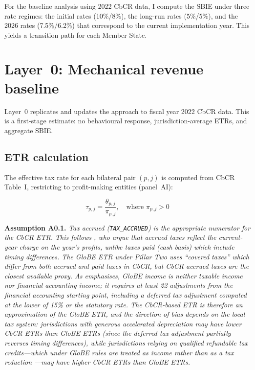 \documentclass[11pt,a4paper]{article}
\newcommand{\code}[1]{\texttt{#1}}
\newcommand{\assumption}[2]{\noindent\textbf{Assumption #1.} \textit{#2}\medskip}
\begin{document}
For the baseline analysis using 2022 CbCR data, I compute the SBIE under three rate regimes: the initial rates (10\%/8\%), the long-run rates (5\%/5\%), and the 2026 rates (7.5\%/6.2\%) that correspond to the current implementation year. This yields a transition path for each Member State.

\section{Layer~0: Mechanical revenue baseline}\label{sec:layer0}

Layer~0 replicates and updates the \citet{barake2022} approach to fiscal year 2022 CbCR data. This is a first-stage estimate: no behavioural response, jurisdiction-average ETRs, and aggregate SBIE.

\subsection{ETR calculation}\label{sec:etr}

The effective tax rate for each bilateral pair $(p, j)$ is computed from CbCR Table~I, restricting to profit-making entities (panel~AI):

\begin{equation}\label{eq:etr}
\tau_{p,j} = \frac{\theta_{p,j}}{\pi_{p,j}}, \quad \text{where } \pi_{p,j} > 0
\end{equation}

\assumption{A0.1}{Tax accrued (\code{TAX\_ACCRUED}) is the appropriate numerator for the CbCR ETR. This follows \citet{hugger2025}, who argue that accrued taxes reflect the current-year charge on the year's profits, unlike taxes paid (cash basis) which include timing differences. The GloBE ETR under Pillar Two uses ``covered taxes'' which differ from both accrued and paid taxes in CbCR, but CbCR accrued taxes are the closest available proxy. As \citet{hanlon2023} emphasises, GloBE income is neither taxable income nor financial accounting income; it requires at least 22 adjustments from the financial accounting starting point, including a deferred tax adjustment computed at the lower of 15\% or the statutory rate. The CbCR-based ETR is therefore an approximation of the GloBE ETR, and the direction of bias depends on the local tax system: jurisdictions with generous accelerated depreciation may have lower CbCR ETRs than GloBE ETRs (since the deferred tax adjustment partially reverses timing differences), while jurisdictions relying on qualified refundable tax credits---which under GloBE rules are treated as income rather than as a tax reduction \citep{liotti2022}---may have higher CbCR ETRs than GloBE ETRs.}
\end{document}
